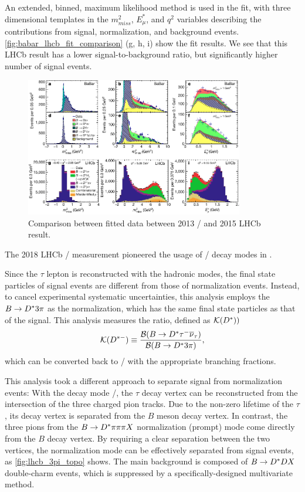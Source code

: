 An extended, binned, maximum likelihood method is used in the fit, with three
dimensional templates in the $m^2_{miss}$, $E^*_\mu$, and $q^2$ variables
describing the contributions from signal, normalization, and background events.
\autoref{fig:babar_lhcb_fit_comparison} (g, h, i) show the fit results.
We see that this LHCb result has a lower signal-to-background ratio, but
significantly higher number of signal events.

\begin{figure}[ht]
    \centering
    \includegraphics[width=0.85\textwidth]{figs/babar_lhcb_fit_comparison.pdf}
    \caption{
        Comparison between fitted data between 2013 \BaBar/ and 2015
        LHCb result\cite{Ciezarek:2017yzh}.
    }
    \label{fig:babar_lhcb_fit_comparison}
\end{figure}

The 2018 LHCb \RDst/ measurement pioneered the usage of \TauHadMode/ decay modes
in \BDstMode{\tau}.

Since the $\tau$ lepton is reconstructed with the hadronic modes, the final
state particles of signal events are different from those of normalization
events.
Instead, to cancel experimental systematic uncertainties, this analysis employs
the $B \rightarrow \Dst/ 3\pi$ as the normalization, which has the same final
state particles as that of the signal.
This analysis measures the ratio, defined as $\mathcal{K}(\Dst/))$
\begin{equation}
    \mathcal{K}(D^{*-}) \equiv \frac{
        \mathcal{B}(\BDstMode{\tau})
    }{
        \mathcal{B}(B \rightarrow \Dst/ 3 \pi)
    },
\end{equation}
which can be converted back to \RDst/ with the appropriate branching fractions.

This analysis took a different approach to separate signal from normalization
events:
With the decay mode \TauHadMode/,
the $\tau$ decay vertex can be reconstructed from the intersection of the three
charged pion tracks.
Due to the non-zero lifetime of the $\tau$, its decay vertex is separated from
the $B$ meson decay vertex.
In contrast, the three pions from the $B \rightarrow \Dst/ \pi \pi \pi X$
normalization (prompt) mode come directly from the $B$ decay vertex.
By requiring a clear separation between the two vertices, the normalization mode
can be effectively separated from signal events, as \autoref{fig:lhcb_3pi_topo}
shows.
The main background is composed of $B \rightarrow \Dst/ D X$ double-charm events,
which is suppressed by a specifically-designed multivariate method.

